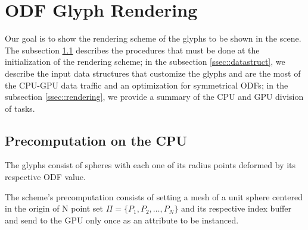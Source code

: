 \documentclass[twoside,twocolumn,10pt]{article}
\begin{document}

\section{ODF Glyph Rendering}
\label{sec::odf_glyph_rendering}

Our goal is to show the rendering scheme of the glyphs to be shown in the scene. The subsection \ref{ssec::precomputation} describes the procedures that must be done at the initialization of the rendering scheme; in the subsection \ref{ssec::datastruct}, we describe the input data structures that customize the glyphs and are the most of the CPU-GPU data traffic and an optimization for symmetrical ODFs; in the subsection \ref{ssec::rendering}, we provide a summary of the CPU and GPU division of tasks.%




\subsection{Precomputation on the CPU}
\label{ssec::precomputation}

The glyphs consist of spheres with each one of its radius points deformed by its respective ODF value.

The scheme's precomputation consists of setting a mesh of a unit sphere centered in the origin of N point set $ \Pi = \{P_1, P_2, \dots, P_N\}$ and its respective index buffer and send to the GPU only once as an attribute to be instanced.


\end{document}

